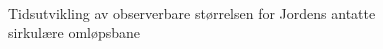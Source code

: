 \begin{figure}[!htb]
	\\[7pt]
	\caption{Tidsutvikling av observerbare størrelsen for Jordens antatte sirkulære omløpsbane}
	\label{fig:1-1ab}
\end{figure}

